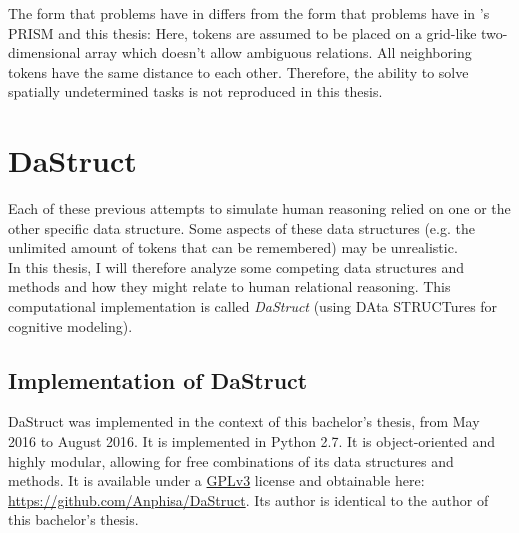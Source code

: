 \documentclass[hidelinks]{scrartcl}
\begin{document}
The form that problems have in \cite{Schultheis.2014} differs from the form that problems have in \cite{Ragni.2013}'s PRISM and this thesis: Here, tokens are assumed to be placed on a grid-like two-dimensional array which doesn't allow ambiguous relations. All neighboring tokens have the same distance to each other. Therefore, the ability to solve spatially undetermined tasks is not reproduced in this thesis.

\section{DaStruct}
Each of these previous attempts to simulate human reasoning relied on one or the other specific data structure. Some aspects of these data structures (e.g. the unlimited amount of tokens that can be remembered) may be unrealistic. \\
In this thesis, I will therefore analyze some competing data structures and methods and how they might relate to human relational reasoning. This computational implementation is called \textit{DaStruct} (using DAta STRUCTures for cognitive modeling).

\subsection{Implementation of DaStruct}
DaStruct was implemented in the context of this bachelor's thesis, from May 2016 to August 2016. It is implemented in Python 2.7. It is object-oriented and highly modular, allowing for free combinations of its data structures and methods. It is available under a \href{https://www.gnu.org/copyleft/gpl.html}{GPLv3} license and obtainable here: \url{https://github.com/Anphisa/DaStruct}. Its author is identical to the author of this bachelor's thesis.\\
\end{document}
